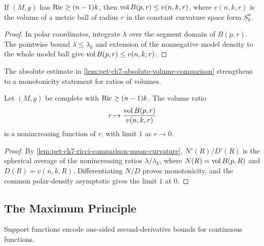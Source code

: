 \begin{lemma}
  \label{lem:pet-ch7-absolute-volume-comparison}
  If $(M,g)$ has $\operatorname{Ric}\ge(n-1)k$, then $\operatorname{vol} B(p,r)\le v(n,k,r)$, where
  $v(n,k,r)$ is the volume of a metric ball of radius $r$ in the constant
  curvature space form $S^n_k$.
\end{lemma}
\begin{proof}
  \sketch
  In polar coordinates, integrate \(\lambda\) over the segment domain of \(B(p,r)\). The pointwise bound \(\lambda\le\lambda_k\) and extension of the nonnegative model density to the whole model ball give \(\operatorname{vol} B(p,r)\le v(n,k,r)\).
\end{proof}

The absolute estimate in \cref{lem:pet-ch7-absolute-volume-comparison}
strengthens to a monotonicity statement for ratios of volumes.

\begin{lemma}
  \label{lem:pet-ch7-relative-volume-comparison}
  Let $(M,g)$ be complete with $\operatorname{Ric}\ge(n-1)k$. The volume ratio
  \[
    r\mapsto\frac{\operatorname{vol} B(p,r)}{v(n,k,r)}
  \]
  is a nonincreasing function of $r$, with limit $1$ as $r\to0$.
\end{lemma}
\begin{proof}
  \sketch
  By \cref{lem:pet-ch7-ricci-comparison-mean-curvature}, \(N'(R)/D'(R)\) is the spherical average of the nonincreasing ratios \(\lambda/\lambda_k\), where \(N(R)=\operatorname{vol} B(p,R)\) and \(D(R)=v(n,k,R)\). Differentiating \(N/D\) proves monotonicity, and the common polar-density asymptotic gives the limit \(1\) at \(0\).
\end{proof}

\subsection{The Maximum Principle}

Support functions encode one-sided second-derivative bounds for continuous
functions.

